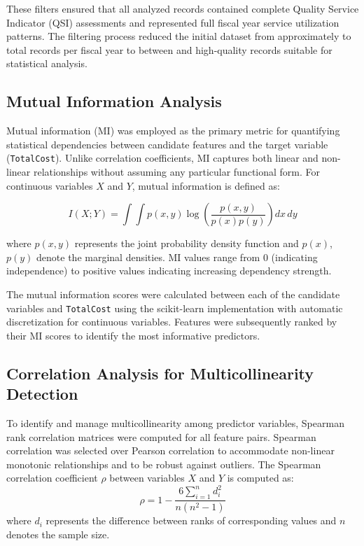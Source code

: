 These filters ensured that all analyzed records contained complete Quality Service Indicator (QSI) assessments and represented full fiscal year service utilization patterns. The filtering process reduced the initial dataset from approximately \FSMinRecordsTotal{} to \FSMaxRecordsTotal{} total records per fiscal year to between \FSMinRecordsFinal{} and \FSMaxRecordsFinal{} high-quality records suitable for statistical analysis.

\subsection{Mutual Information Analysis}
\label{subsec:mutual-information}

Mutual information (MI) was employed as the primary metric for quantifying statistical dependencies between candidate features and the target variable (\texttt{TotalCost}). Unlike correlation coefficients, MI captures both linear and non-linear relationships without assuming any particular functional form. For continuous variables $X$ and $Y$, mutual information is defined as:

\begin{equation}
I(X;Y) = \int\int p(x,y) \log\left(\frac{p(x,y)}{p(x)p(y)}\right) dx\,dy
\label{eq:mutual-information}
\end{equation}

where $p(x,y)$ represents the joint probability density function and $p(x)$, $p(y)$ denote the marginal densities. MI values range from 0 (indicating independence) to positive values indicating increasing dependency strength.

The mutual information scores were calculated between each of the \FSNumCandidateVariables{} candidate variables and \texttt{TotalCost} using the scikit-learn implementation with automatic discretization for continuous variables. Features were subsequently ranked by their MI scores to identify the most informative predictors.

\subsection{Correlation Analysis for Multicollinearity Detection}
\label{subsec:correlation-analysis}

To identify and manage multicollinearity among predictor variables, Spearman rank correlation matrices were computed for all feature pairs. Spearman correlation was selected over Pearson correlation to accommodate non-linear monotonic relationships and to be robust against outliers. The Spearman correlation coefficient $\rho$ between variables $X$ and $Y$ is computed as:
%
\begin{equation}
\rho = 1 - \frac{6\sum_{i=1}^{n}d_i^2}{n(n^2-1)}
\label{eq:spearman}
\end{equation}
%
where $d_i$ represents the difference between ranks of corresponding values and $n$ denotes the sample size.

